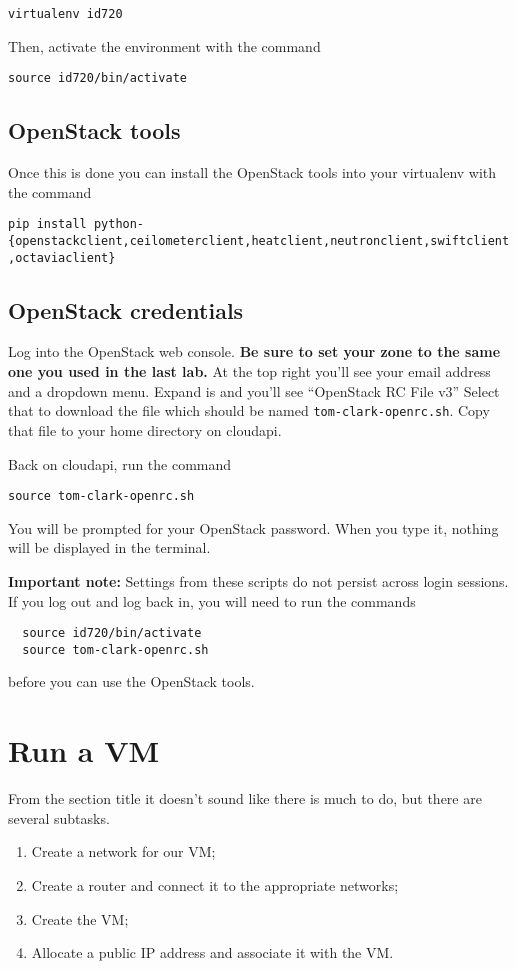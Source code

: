 \documentclass{article}
\begin{document}
  \texttt{virtualenv id720}
  
  Then, activate the environment with the command
  
  \texttt{source id720/bin/activate}
  
   \subsection{OpenStack tools}
   
  Once this is done you can install the OpenStack tools into your virtualenv with the command
  
  \texttt{pip install python-\{openstackclient,ceilometerclient,heatclient,neutronclient,swiftclient,octaviaclient\}}
  
  \subsection{OpenStack credentials}
  Log into the OpenStack web console. \textbf{Be sure to set your zone to the same one you used in the last lab.} At the top right you'll see your email address and a dropdown menu. Expand is and you'll see ``OpenStack RC File v3'' Select that to download the file which should be named \texttt{tom-clark-openrc.sh}. Copy that file to your home directory on cloudapi.
  
  Back on cloudapi, run the command
  
  \texttt{source tom-clark-openrc.sh}
  
  You will be prompted for your OpenStack password. When you type it, nothing will be displayed in the terminal.
  
  \textbf{Important note:} Settings from these scripts do not persist across login sessions. If you log out and log back in, you will need to run the commands
  
  \begin{verbatim}
  source id720/bin/activate
  source tom-clark-openrc.sh
  \end{verbatim}
  
 before you can use the OpenStack tools.
 
 \section{Run a VM}
 From the section title it doesn't sound like there is much to do, but there are several subtasks. 
 
 \begin{enumerate}
   \item Create a network for our VM;
   \item Create a router and connect it to the appropriate networks;
   \item Create the VM;
   \item Allocate a public IP address and associate it with the VM.
  \end{enumerate}
  
\end{document}

